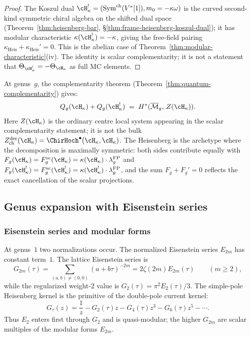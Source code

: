 \begin{proof}
The Koszul dual
$\cH_\kappa^!=(\operatorname{Sym}^{\mathrm{ch}}(V^*[1]),m_0=-\kappa\omega)$
is the curved second-kind symmetric chiral algebra on the shifted dual
space
(Theorem~\ref{thm:heisenberg-bar}, \S\ref{thm:frame-heisenberg-koszul-dual});
it has modular characteristic $\kappa(\cH_\kappa^!) = -\kappa$, giving
the free-field pairing
$\kappa_{\mathrm{Heis}}+\kappa_{\mathrm{Heis}}'=0$. This is the
abelian case of Theorem~\ref{thm:modular-characteristic}(iv).
The identity is scalar complementarity; it is not a statement that
$\Theta_{\cH_\kappa^!}=-\Theta_{\cH_\kappa}$ as full MC elements.
\end{proof}

\begin{remark}
\label{rem:heisenberg-quantum-complementarity}
At genus~$g$, the complementarity theorem
(Theorem~\ref{thm:quantum-complementarity}) gives:
\[
Q_g(\cH_\kappa) + Q_g(\cH_\kappa^!)
\;=\; H^*(\overline{\mathcal{M}}_g,\, Z(\cH_\kappa)).
\]
Here $Z(\cH_\kappa)$ is the ordinary centre local system appearing in
the scalar complementarity statement; it is not the bulk
$Z^{\mathrm{der}}_{\mathrm{ch}}(\cH_\kappa)
=\ChirHoch^\bullet(\cH_\kappa,\cH_\kappa)$.
The Heisenberg is the archetype where the decomposition is
maximally symmetric: both sides contribute equally with
$F_g(\cH_\kappa)=F_g^{\mathrm{sc}}(\cH_\kappa)
= \kappa(\cH_\kappa) \cdot \lambda_g^{\mathrm{FP}}$ and
$F_g(\cH_\kappa^!)=F_g^{\mathrm{sc}}(\cH_\kappa^!)
= \kappa(\cH_\kappa^!) \cdot \lambda_g^{\mathrm{FP}}$,
and the sum $F_g + F_g' = 0$ reflects the exact cancellation
of the scalar projections.
\end{remark}

\subsection{Genus expansion with Eisenstein series}
\label{sec:heisenberg-genus-expansion-eisenstein}

\subsubsection{Eisenstein series and modular forms}
\label{subsec:eisenstein-recollection}

At genus~$1$ two normalizations occur. The normalized Eisenstein
series $E_{2m}$ has constant term~$1$. The lattice Eisenstein series
is
\[
G_{2m}(\tau)
=\sum_{(a,b)\ne(0,0)}(a+b\tau)^{-2m}
=2\zeta(2m)E_{2m}(\tau)\qquad (m\ge2),
\]
while the regularized weight-$2$ value is
$G_2(\tau)=\pi^2E_2(\tau)/3$. The simple-pole Heisenberg kernel is
the primitive of the double-pole current kernel:
\[
G_\tau(z)=\frac1z-G_2(\tau)z-G_4(\tau)z^3-G_6(\tau)z^5-\cdots .
\]
Thus $E_2$ enters first through $G_2$ and is quasi-modular; the
higher $G_{2m}$ are scalar multiples of the modular forms $E_{2m}$.

